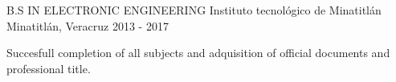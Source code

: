 


\begin{cventries}


\cventry
{B.S IN ELECTRONIC ENGINEERING} %
{Instituto tecnológico de Minatitlán} %
{Minatitlán, Veracruz} %
{2013 - 2017} %
{ %
\begin{cvitems}
\item {Succesfull completion of all subjects and adquisition of official documents and professional title.}
\end{cvitems}
}


\end{cventries}